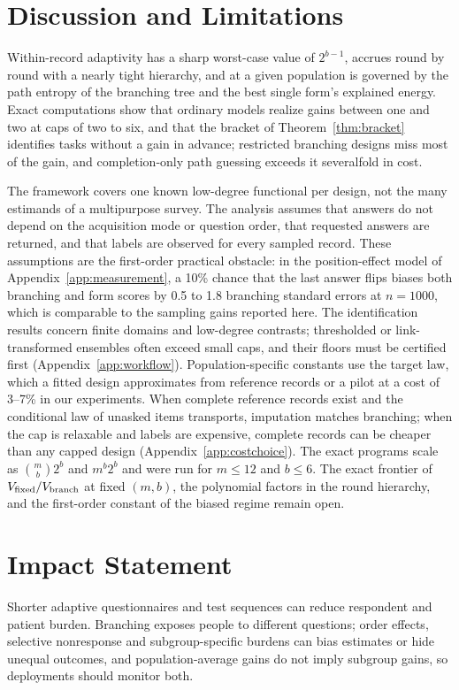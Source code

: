 \documentclass{article}
\begin{document}
\section{Discussion and Limitations}\label{sec:discussion}
Within-record adaptivity has a sharp worst-case value of $2^{b-1}$, accrues round by round with a nearly tight hierarchy, and at a given population is governed by the path entropy of the branching tree and the best single form's explained energy. Exact computations show that ordinary models realize gains between one and two at caps of two to six, and that the bracket of Theorem~\ref{thm:bracket} identifies tasks without a gain in advance; restricted branching designs miss most of the gain, and completion-only path guessing exceeds it severalfold in cost.

The framework covers one known low-degree functional per design, not the many estimands of a multipurpose survey. The analysis assumes that answers do not depend on the acquisition mode or question order, that requested answers are returned, and that labels are observed for every sampled record. These assumptions are the first-order practical obstacle: in the position-effect model of Appendix~\ref{app:measurement}, a 10\% chance that the last answer flips biases both branching and form scores by 0.5 to 1.8 branching standard errors at $n=1000$, which is comparable to the sampling gains reported here. The identification results concern finite domains and low-degree contrasts; thresholded or link-transformed ensembles often exceed small caps, and their floors must be certified first (Appendix~\ref{app:workflow}). Population-specific constants use the target law, which a fitted design approximates from reference records or a pilot at a cost of 3--7\% in our experiments. When complete reference records exist and the conditional law of unasked items transports, imputation matches branching; when the cap is relaxable and labels are expensive, complete records can be cheaper than any capped design (Appendix~\ref{app:costchoice}). The exact programs scale as $\binom mb2^b$ and $m^b2^b$ and were run for $m\le12$ and $b\le6$. The exact frontier of $V_{\rm fixed}/V_{\rm branch}$ at fixed $(m,b)$, the polynomial factors in the round hierarchy, and the first-order constant of the biased regime remain open.

\section*{Impact Statement}
Shorter adaptive questionnaires and test sequences can reduce respondent and patient burden. Branching exposes people to different questions; order effects, selective nonresponse and subgroup-specific burdens can bias estimates or hide unequal outcomes, and population-average gains do not imply subgroup gains, so deployments should monitor both.



\clearpage
\onecolumn
\raggedbottom
\appendix
\renewcommand{\thesection}{A\arabic{section}}

\end{document}
